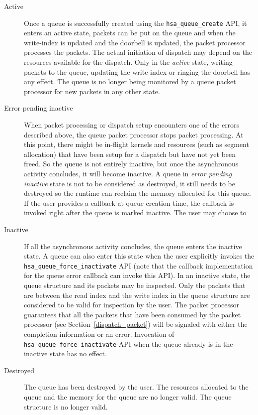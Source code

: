 \begin{description}
\item[Active] Once a queue is successfully created using the
\texttt{hsa\_queue\_create} API, it enters an active state, packets can
be put on the queue and when the write-index is updated and the
doorbell is updated, the packet processor processes the packets. The
actual initiation of dispatch may depend on the resources available
for the dispatch. 
Only in the \emph{active} state, writing packets to
the queue, updating the write index or ringing the doorbell has 
any effect. The queue is no longer being monitored by a queue packet
processor for new packets in any other state.

\item[Error pending inactive] When packet processing or
dispatch setup encounters one of the errors described above, the
queue packet processor stops packet processing. 
At this point, there might be in-flight kernels and resources (such
as segment allocation) that have been setup for a dispatch but have
not yet been freed. So the queue is not entirely inactive, but once
the asynchronous activity concludes, it will become inactive.  A
queue in \emph{error pending inactive} state is not to be considered
as destroyed, it still needs to be destroyed so the runtime can
reclaim the memory allocated for this queue. If the user provides a
callback at queue creation time, the callback is invoked right after
the queue is marked inactive. The user may choose to 

\item[Inactive] If all the asynchronous activity concludes, the
queue enters the inactive state. 
A queue can also enter this state when the user explicitly invokes
the \texttt{hsa\_queue\_force\_inactivate} API (note that the callback
implementation for the queue error callback can invoke this API).  
In an inactive state, the queue
structure and its packets may be inspected. Only the packets that
are between the read index and the write index
in the queue structure are considered to be valid for inspection by
the user. The packet processor guarantees that all the packets that
have been consumed by the packet processor (see
Section~\ref{dispatch_packet}) will be signaled with either the
completion information or an error. 
Invocation of \texttt{hsa\_queue\_force\_inactivate} API when the
queue already is in the inactive state has no effect.

\item[Destroyed] The queue has been destroyed by the user.  The
resources allocated to the queue and the memory for the queue are no
longer valid. The queue structure is no longer valid. 
\end{description}

